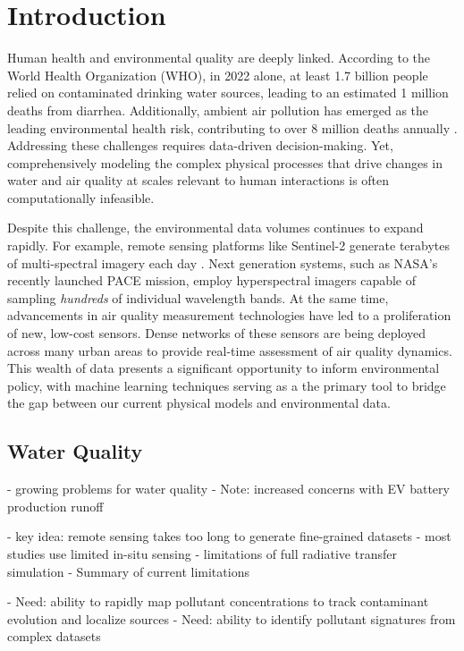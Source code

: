 \chapter{Introduction}\label{ch:intro}


Human health and environmental quality are deeply linked. According to
the World Health Organization (WHO), in 2022 alone, at least 1.7 billion people
relied on contaminated drinking water sources, leading to an estimated 1 million
deaths from diarrhea. Additionally, ambient air pollution has emerged as the
leading environmental health risk, contributing to over 8 million deaths
annually \cite{air-pollution-mortality}. Addressing these challenges requires
data-driven decision-making. Yet, comprehensively modeling the complex physical
processes that drive changes in water and air quality at scales relevant to
human interactions is often computationally infeasible.

Despite this challenge, the environmental data volumes continues to expand
rapidly. For example, remote sensing platforms like Sentinel-2 generate
terabytes of multi-spectral imagery each day \cite{sentinel-2-data}. Next
generation systems, such as NASA’s recently launched PACE mission,
employ hyperspectral imagers capable of sampling \textit{hundreds} of individual
wavelength bands. At the same time, advancements in air quality measurement
technologies have led to a proliferation of new, low-cost sensors. Dense
networks of these sensors are being deployed across many urban areas to provide
real-time assessment of air quality dynamics. This wealth of data presents a
significant opportunity to inform environmental policy, with machine learning
techniques serving as a the primary tool to bridge the gap between our current
physical models and environmental data.




\section{Water Quality}


- growing problems for water quality
- Note: increased concerns with EV battery production runoff

- key idea: remote sensing takes too long to generate fine-grained datasets
- most studies use limited in-situ sensing
- limitations of full radiative transfer simulation
- Summary of current limitations

- Need: ability to rapidly map pollutant concentrations to track contaminant
evolution and localize sources
- Need: ability to identify pollutant signatures from complex datasets

